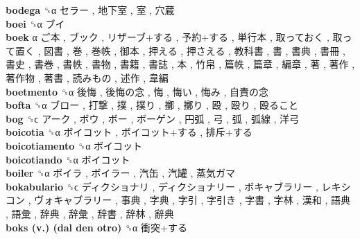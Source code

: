 \textbf{bodega} ␝α   セラー ,  地下室 ,  室 ,  穴蔵   \\
\textbf{boei} ␝α   ブイ   \\
\textbf{boek} α   ご本 ,  ブック ,  リザーブ+する ,  予約+する ,  単行本 ,  取っておく ,  取って置く ,  図書 ,  巻 ,  巻帙 ,  御本 ,  押える ,  押さえる ,  教科書 ,  書 ,  書典 ,  書冊 ,  書史 ,  書巻 ,  書帙 ,  書物 ,  書籍 ,  書誌 ,  本 ,  竹帛 ,  篇帙 ,  篇章 ,  編章 ,  著 ,  著作 ,  著作物 ,  著書 ,  読みもの ,  述作 ,  韋編   \\
\textbf{boetmento} ␝α   後悔 ,  後悔の念 ,  悔 ,  悔い ,  悔み ,  自責の念   \\
\textbf{bofta} ␝α   ブロー ,  打撃 ,  撲 ,  撲り ,  擲 ,  擲り ,  殴 ,  殴り ,  殴ること   \\
\textbf{bog} ␝ϲ   アーク ,  ボウ ,  ボー ,  ボーゲン ,  円弧 ,  弓 ,  弧 ,  弧線 ,  洋弓   \\
\textbf{boicotia} ␝α   ボイコット ,  ボイコット+する ,  排斥+する   \\
\textbf{boicotiamento} ␝α   ボイコット   \\
\textbf{boicotiando} ␝α   ボイコット   \\
\textbf{boiler} ␝α   ボイラ ,  ボイラー ,  汽缶 ,  汽罐 ,  蒸気ガマ   \\
\textbf{bokabulario} ␝ϲ   ディクショナリ ,  ディクショナリー ,  ボキャブラリー ,  レキシコン ,  ヴォキャブラリー ,  事典 ,  字典 ,  字引 ,  字引き ,  字書 ,  字林 ,  漢和 ,  語典 ,  語彙 ,  辞典 ,  辞彙 ,  辞書 ,  辞林 ,  辭典   \\
\textbf{boks (v.) (dal den otro)} ␝α   衝突+する   \\
